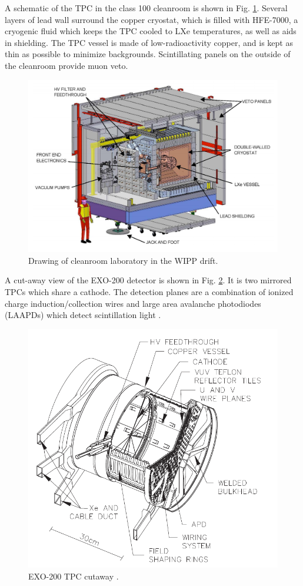 A schematic of the TPC in the class 100 cleanroom is shown in Fig. \ref{fig:cleanroom}.  Several layers of lead wall surround the copper cryostat, which is filled with HFE-7000, a cryogenic fluid which keeps the TPC cooled to LXe temperatures, as well as aids in shielding.  The TPC vessel is made of low-radioactivity copper, and is kept as thin as possible to minimize backgrounds.  Scintillating panels on the outside of the cleanroom provide muon veto.

\begin{figure} %
	\centering
	\includegraphics[width=.9\textwidth]{figures/cleanroom.png}
	\caption{Drawing of cleanroom laboratory in the WIPP drift.}
\label{fig:cleanroom}
\end{figure}

A cut-away view of the EXO-200 detector is shown in Fig. \ref{fig:tpc}.  It is two mirrored TPCs which share a cathode.  The detection planes are a combination of ionized charge induction/collection wires and large area avalanche photodiodes (LAAPDs) which detect scintillation light \cite{APDs}.

\begin{figure} %
	\centering
	\includegraphics[width=.9\textwidth]{figures/TPC.png}
	\caption{EXO-200 TPC cutaway \cite{EXO200TwoNuLong}.}
\label{fig:tpc}
\end{figure}

